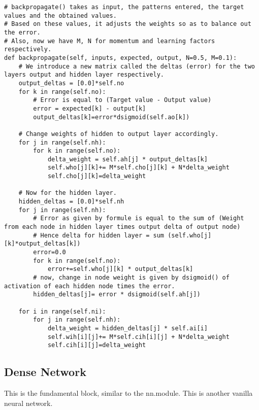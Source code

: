 \documentclass{article}
\begin{document}
\begin{lstlisting}
# backpropagate() takes as input, the patterns entered, the target values and the obtained values.
# Based on these values, it adjusts the weights so as to balance out the error.
# Also, now we have M, N for momentum and learning factors respectively.
def backpropagate(self, inputs, expected, output, N=0.5, M=0.1):
	# We introduce a new matrix called the deltas (error) for the two layers output and hidden layer respectively.
	output_deltas = [0.0]*self.no
	for k in range(self.no):
		# Error is equal to (Target value - Output value)
		error = expected[k] - output[k]
		output_deltas[k]=error*dsigmoid(self.ao[k])

	# Change weights of hidden to output layer accordingly.
	for j in range(self.nh):
		for k in range(self.no):
			delta_weight = self.ah[j] * output_deltas[k]
			self.who[j][k]+= M*self.cho[j][k] + N*delta_weight
			self.cho[j][k]=delta_weight

	# Now for the hidden layer.
	hidden_deltas = [0.0]*self.nh
	for j in range(self.nh):
		# Error as given by formule is equal to the sum of (Weight from each node in hidden layer times output delta of output node)
		# Hence delta for hidden layer = sum (self.who[j][k]*output_deltas[k])
		error=0.0
		for k in range(self.no):
			error+=self.who[j][k] * output_deltas[k]
		# now, change in node weight is given by dsigmoid() of activation of each hidden node times the error.
		hidden_deltas[j]= error * dsigmoid(self.ah[j])

	for i in range(self.ni):
		for j in range(self.nh):
			delta_weight = hidden_deltas[j] * self.ai[i]
			self.wih[i][j]+= M*self.cih[i][j] + N*delta_weight
			self.cih[i][j]=delta_weight
\end{lstlisting}
\clearpage
\subsection{Dense Network}
This is the fundamental block, similar to the nn.module. This is another vanilla
neural network.
\end{document}
